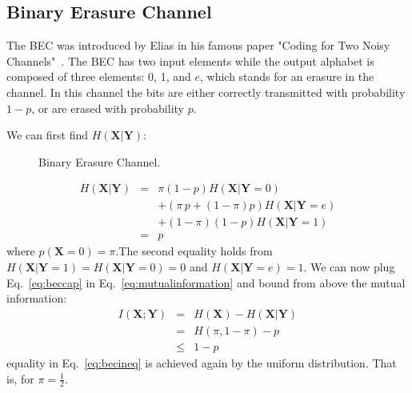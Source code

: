 \subsection{Binary Erasure Channel}
The {BEC} was introduced by Elias in his famous paper "Coding for Two Noisy Channels"~\cite{Elias_55}. The {BEC} has two input elements while the output alphabet is composed of three elements: 0, 1, and $e$, which stands for an erasure in the channel. In this channel the bits are either correctly transmitted with probability $1-p$, or are erased with probability $p$. 

We can first find $H(\mathbf X|\mathbf Y) $: 

\begin{figure}[h]
\begin{center}
\def\svgwidth{\columnwidth} 
 
\caption{Binary Erasure Channel.}
\label{fig:bec}
\end{center}
\end{figure}


\begin{eqnarray}
\label{eq:beccap}
H(\mathbf X|\mathbf Y) &=& \pi (1-p )H(\mathbf X|\mathbf Y=0) \nonumber\\
           && + \left( \pi\, p +(1-\pi)p\right) H(\mathbf X|\mathbf Y=e)\nonumber\\
           && + (1-\pi)(1-p)H(\mathbf X|\mathbf Y=1) \\
           &=& p
\end{eqnarray}
\noindent where $p(\mathbf X=0)=\pi$.The second equality holds from $H(\mathbf X|\mathbf Y=1)=H(\mathbf X|\mathbf Y=0)=0$ and $H(\mathbf X|\mathbf Y=e)=1$. We can now plug Eq.~\ref{eq:beccap} in Eq.~\ref{eq:mutualinformation} and bound from above the mutual information:
\begin{eqnarray}
I(\mathbf X;\mathbf Y) &=& H(\mathbf X) - H(\mathbf X|\mathbf Y) \\
         &=& H(\pi, 1-\pi) - p\\
         & \leq & 1 - p\label{eq:becineq}
\end{eqnarray}
\noindent equality in Eq.~\ref{eq:becineq} is achieved again by the uniform distribution. That is, for $\pi=\frac{1}{2}$.

